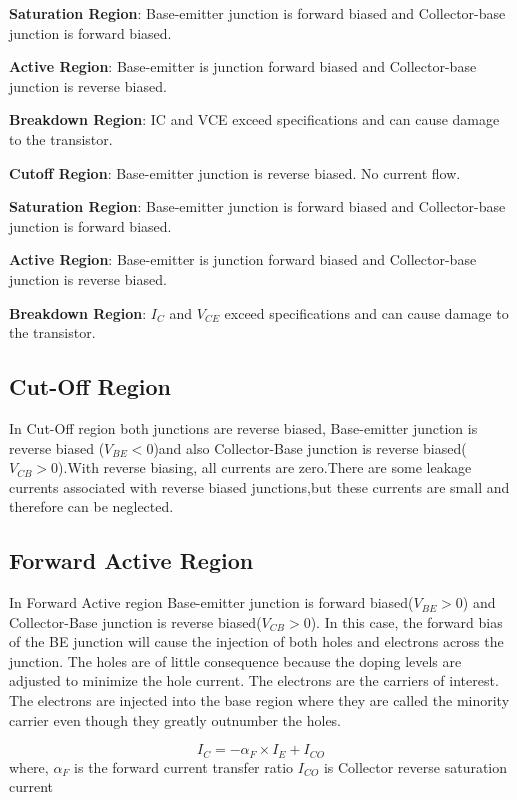 			\textbf{Saturation Region}: Base-emitter junction is forward biased and Collector-base junction is forward biased.
			
			\textbf{Active Region}: Base-emitter is junction forward biased and Collector-base junction is reverse biased.
			
			\textbf{Breakdown Region}: IC and VCE exceed specifications and can cause damage to the transistor.
			
			\textbf{Cutoff Region}: Base-emitter junction is reverse biased. No current flow.
			
			\textbf{Saturation Region}: Base-emitter junction is forward biased and Collector-base junction is forward biased.
			
			\textbf{Active Region}: Base-emitter is junction forward biased and Collector-base junction is reverse biased.
			
			\textbf{Breakdown Region}: \(I_C\) and \(V_{CE}\) exceed specifications and can cause damage to the transistor.
			
		\subsection{Cut-Off Region}
			In Cut-Off region both junctions are reverse biased, Base-emitter junction is reverse biased (\(V_{BE}<0\))and also Collector-Base junction is reverse biased(\(V_{CB}>0\)).With reverse biasing, all currents are zero.There are some leakage currents associated with reverse biased junctions,but these currents are small and therefore can be neglected.
			
		\subsection{Forward Active Region}
			In Forward Active region Base-emitter junction is forward biased(\(V_{BE}>0\)) and Collector-Base junction is reverse biased(\(V_{CB}>0\)). In this case, the forward bias of the BE junction will cause the injection of both holes and electrons across the junction. The holes are of little consequence because the doping levels are adjusted to minimize the hole current. The electrons are the carriers of interest. The electrons are injected into the base region where they are called the minority carrier even though they greatly outnumber the holes.
			
			$$I_C= -\alpha_F \times I_E + I_{CO}$$
			where,
			\(\alpha_F\) is the forward current transfer ratio
			\(I_{CO}\) is Collector reverse saturation current
		
